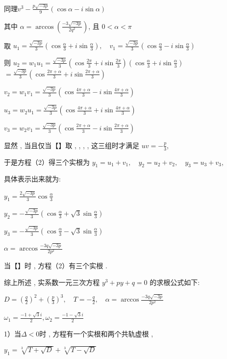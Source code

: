 同理$v^{3}-\frac{p \sqrt{-3 p}}{9}(\cos \alpha-i \sin \alpha)$

其中 $\alpha=\arccos \left(\frac{-3 \sqrt{-3 p}}{2 q^{2}}\right)$, 且 $0<\alpha<\pi$

取 $u_{1}=\frac{\sqrt{-3 p}}{3}\left(\cos \frac{\alpha}{3}+i \sin \frac{\alpha}{3}\right), \quad v_{1}=\frac{\sqrt{-3 p}}{3}\left(\cos \frac{\alpha}{3}-i \sin \frac{\alpha}{3}\right)$

则 $u_{2}
=w_{1} u_{1}
=\frac{\sqrt{-3 p}}{3}\left(\cos \frac{2 \pi}{3}+i \sin \frac{2 \pi}{3}\right)\left(\cos \frac{\alpha}{3}+i \sin \frac{\alpha}{3}\right)$
$=\frac{\sqrt{-3 p}}{3}\left(\cos \frac{2 \pi+\alpha}{3}+i \sin \frac{2 \pi+\alpha}{3}\right)$

$v_{2}=w_{1} v_{1}=\frac{\sqrt{-3 p}}{3}\left(\cos \frac{4 \pi+\alpha}{3}-i \sin \frac{4 \pi+\alpha}{3}\right)$

$u_{3}=w_{2} u_{1}=\frac{\sqrt{-3 p}}{3}\left(\cos \frac{4 \pi+\alpha}{3}+i \sin \frac{4 \pi+\alpha}{3}\right)$

$v_{3}=w_{2} v_{1}=\frac{\sqrt{-3 p}}{3}\left(\cos \frac{2 \pi+\alpha}{3}-i \sin \frac{2 \pi+\alpha}{3}\right)$

显然 , 当且仅当【】取 ,  ,  ,  ,  这三组时才满足 $uv=-\frac{p}{3}$,

于是方程（2）得三个实根为 $y_{1}=u_{1}+v_{1}, \quad y_{2}=u_{2}+v_{2}, \quad y_{3}=u_{3}+v_{3}$,

具体表示出来就为:

$y_{1}=\frac{2 \sqrt{-3 p}}{3} \cos \frac{\alpha}{3}$

$y_{2}=-\frac{\sqrt{-3 p}}{3}\left(\cos \frac{\alpha}{3}+\sqrt{3} \sin \frac{\alpha}{3}\right)$

$y_{3}=-\frac{\sqrt{-3 p}}{3}\left(\cos \frac{\alpha}{3}-\sqrt{3} \sin \frac{\alpha}{3}\right)$

$\alpha=\arccos \frac{-3 q \sqrt{-3 p}}{2 p^{2}}$

当【】时 , 方程（2）有三个实根 .  

综上所述 , 实系数一元三次方程 $y^{3}+p y+q=0$ 的求根公式如下:

$D=\left(\frac{q}{2}\right)^{2}+\left(\frac{p}{3}\right)^{3}, \quad T=-\frac{q}{2}, \quad \alpha=\arccos \frac{-3 q \sqrt{-3 p}}{2 p^{2}}$

$\omega_{1}=\frac{-1+\sqrt{3} i}{2}, \omega_{2}=\frac{-1-\sqrt{3} i}{2}$

1）当$\Delta<0$时 , 方程有一个实根和两个共轨虚根 ,  

$y_{1}=\sqrt[3]{T+\sqrt{D}}+\sqrt[3]{T-\sqrt{D}}$

